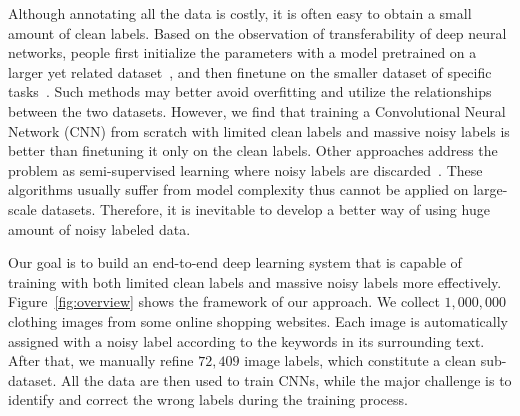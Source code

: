 \documentclass[10pt,twocolumn,letterpaper]{article}
\begin{document}
Although annotating all the data is costly, it is often easy to obtain a small amount of clean labels. Based on the observation of transferability of deep neural networks, people first initialize the parameters with a model pretrained on a larger yet related dataset~\cite{krizhevsky2012imagenet}, and then finetune on the smaller dataset of specific tasks~\cite{oquab2013learning,azizpour2014generic,donahue2013decaf}. Such methods may better avoid overfitting and utilize the relationships between the two datasets. However, we find that training a Convolutional Neural Network (CNN) from scratch with limited clean labels and massive noisy labels is better than finetuning it only on the clean labels. Other approaches address the problem as semi-supervised learning where noisy labels are discarded~\cite{zhu2002learning}. These algorithms usually suffer from model complexity thus cannot be applied on large-scale datasets. Therefore, it is inevitable to develop a better way of using huge amount of noisy labeled data.

Our goal is to build an end-to-end deep learning system that is capable of training with both limited clean labels and massive noisy labels more effectively. Figure~\ref{fig:overview} shows the framework of our approach. We collect $1,000,000$ clothing images from some online shopping websites. Each image is automatically assigned with a noisy label according to the keywords in its surrounding text. After that, we manually refine $72,409$ image labels, which constitute a clean sub-dataset. All the data are then used to train CNNs, while the major challenge is to identify and correct the wrong labels during the training process.
\end{document}

